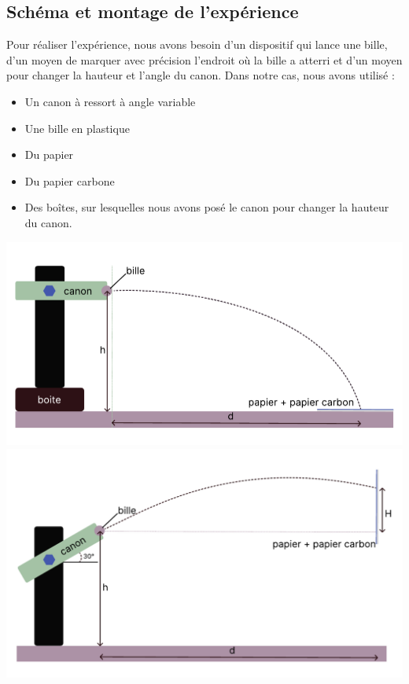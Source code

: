 \documentclass[12pt,a4paper]{article}
\begin{document}
    
    \subsection{Schéma et montage de l’expérience}
    Pour réaliser l'expérience, nous avons besoin d'un dispositif qui lance une bille, d'un moyen de marquer avec précision l'endroit où la bille a atterri et d'un moyen pour changer la hauteur et l'angle du canon.
    Dans notre cas, nous avons utilisé :
    \begin{itemize}
        \item Un canon à ressort à angle variable
        \item Une bille en plastique
        \item Du papier
        \item Du papier carbone
        \item Des boîtes, sur lesquelles nous avons posé le canon pour changer la hauteur du canon.
    \end{itemize}  
    \includegraphics[width=0.4\paperwidth]{images/exp1_2.pdf}
    \includegraphics[width=0.4\paperwidth]{images/exp2_1.pdf}
    
\end{document}
